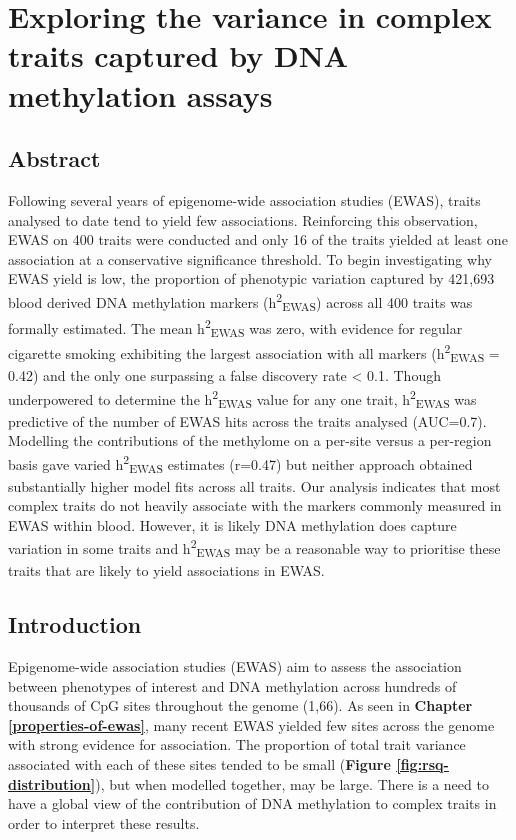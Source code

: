 \documentclass[11pt,oneside]{bristolthesis}
\begin{document}
\hypertarget{h2ewas-chapter}{%
\chapter{Exploring the variance in complex traits captured by DNA methylation assays}\label{h2ewas-chapter}}

\hypertarget{abstract-05}{%
\section{Abstract}\label{abstract-05}}

Following several years of epigenome-wide association studies (EWAS), traits analysed to date tend to yield few associations. Reinforcing this observation, EWAS on 400 traits were conducted and only 16 of the traits yielded at least one association at a conservative significance threshold. To begin investigating why EWAS yield is low, the proportion of phenotypic variation captured by 421,693 blood derived DNA methylation markers (h\textsuperscript{2}\textsubscript{EWAS}) across all 400 traits was formally estimated. The mean h\textsuperscript{2}\textsubscript{EWAS} was zero, with evidence for regular cigarette smoking exhibiting the largest association with all markers (h\textsuperscript{2}\textsubscript{EWAS} = 0.42) and the only one surpassing a false discovery rate \textless{} 0.1. Though underpowered to determine the h\textsuperscript{2}\textsubscript{EWAS} value for any one trait, h\textsuperscript{2}\textsubscript{EWAS} was predictive of the number of EWAS hits across the traits analysed (AUC=0.7). Modelling the contributions of the methylome on a per-site versus a per-region basis gave varied h\textsuperscript{2}\textsubscript{EWAS} estimates (r=0.47) but neither approach obtained substantially higher model fits across all traits. Our analysis indicates that most complex traits do not heavily associate with the markers commonly measured in EWAS within blood. However, it is likely DNA methylation does capture variation in some traits and h\textsuperscript{2}\textsubscript{EWAS} may be a reasonable way to prioritise these traits that are likely to yield associations in EWAS.

\hypertarget{introduction-05}{%
\section{Introduction}\label{introduction-05}}

Epigenome-wide association studies (EWAS) aim to assess the association between phenotypes of interest and DNA methylation across hundreds of thousands of CpG sites throughout the genome (1,66). As seen in \textbf{Chapter \ref{properties-of-ewas}}, many recent EWAS yielded few sites across the genome with strong evidence for association. The proportion of total trait variance associated with each of these sites tended to be small (\textbf{Figure \ref{fig:rsq-distribution}}), but when modelled together, may be large. There is a need to have a global view of the contribution of DNA methylation to complex traits in order to interpret these results.
\end{document}
